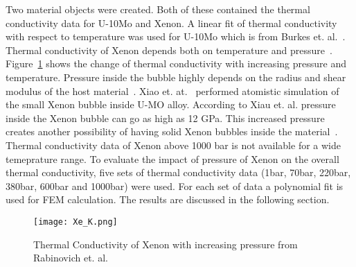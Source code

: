 \begin{doublespacing}
Two material objects were created. Both of these contained the thermal conductivity data for U-10Mo and Xenon. A linear fit of thermal conductivity with respect to temperature was used for U-10Mo which is from Burkes et. al.~\cite{burkes2010thermo}. Thermal conductivity of Xenon depends both on temperature and pressure~\cite{rabinovich1987thermophysical}. Figure~\ref{fig_Xe_K} shows the change of thermal conductivity with increasing pressure and temperature. Pressure inside the bubble highly depends on the radius and shear modulus of the host material~\cite{greenwood1959role,trinkaus1983energetics}. Xiao et. at.~\cite{xiao2015atomistic} performed atomistic simulation of the small Xenon bubble inside U-MO alloy. According to Xiau et. al. pressure inside the Xenon bubble can go as high as 12 GPa. This increased pressure creates another possibility of having solid Xenon bubbles inside the material~\cite{thomas1991condensed,ross1980condensed,zheng2014thermodynamics}. Thermal conductivity data of Xenon above 1000 bar is not available for a wide temeprature range. To evaluate the impact of pressure of Xenon on the overall thermal conductivity, five sets of thermal conductivity data (1bar, 70bar, 220bar, 380bar, 600bar and 1000bar) were used. For each set of data a polynomial fit is used for FEM calculation. The results are discussed in the following section.



\begin{figure}[H]
\centering
\texttt{[image: Xe\_K.png]}
\caption{Thermal Conductivity of Xenon with increasing pressure from Rabinovich et. al.~\cite{rabinovich1987thermophysical}}
\label{fig_Xe_K}
\end{figure}



\end{doublespacing}
